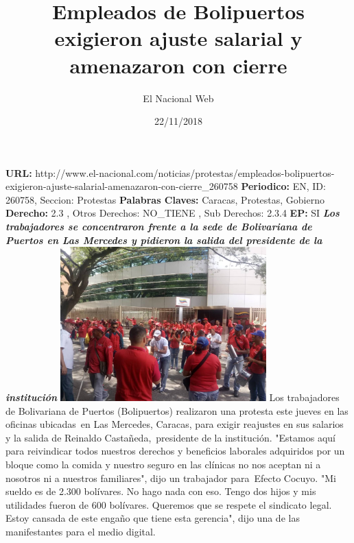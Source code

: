 \documentclass{article}%
\title{\textbf{Empleados de Bolipuertos exigieron ajuste salarial y amenazaron con cierre}}%
\author{El Nacional Web}%
\date{22/11/2018}%
\begin{document}
%
\normalsize%
\maketitle%
\textbf{URL: }%
http://www.el{-}nacional.com/noticias/protestas/empleados{-}bolipuertos{-}exigieron{-}ajuste{-}salarial{-}amenazaron{-}con{-}cierre\_260758\newline%
%
\textbf{Periodico: }%
EN, %
ID: %
260758, %
Seccion: %
Protestas\newline%
%
\textbf{Palabras Claves: }%
Caracas, Protestas, Gobierno\newline%
%
\textbf{Derecho: }%
2.3%
, Otros Derechos: %
NO\_TIENE%
, Sub Derechos: %
2.3.4%
\newline%
%
\textbf{EP: }%
SI\newline%
\newline%
%
\textbf{\textit{Los trabajadores se concentraron frente a la sede de Bolivariana de Puertos en Las Mercedes y pidieron la salida del presidente de la institución}}%
\newline%
\newline%
%
\includegraphics[width=300px]{138.jpg}%
\newline%
%
Los trabajadores de Bolivariana de Puertos (Bolipuertos) realizaron una protesta este jueves en las oficinas ubicadas~en Las Mercedes, Caracas, para exigir reajustes en sus salarios y la salida de Reinaldo Castañeda,~presidente de la institución.%
\newline%
%
"Estamos aquí para reivindicar todos nuestros derechos y beneficios laborales adquiridos por un bloque como la comida y nuestro seguro en las clínicas no nos aceptan ni a nosotros ni a nuestros familiares", dijo un trabajador para~Efecto Cocuyo.%
\newline%
%
"Mi sueldo es de 2.300 bolívares. No hago nada con eso. Tengo dos hijos y mis utilidades fueron de 600 bolívares. Queremos que se respete el sindicato legal. Estoy cansada de este engaño que tiene esta gerencia", dijo una de las manifestantes para el medio digital.%
\end{document}
